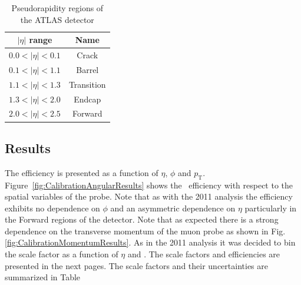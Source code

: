 \begin{table}[thbp]
  \centering
  \caption{Pseudorapidity regions of the ATLAS detector} \label{tab:CalibrationEtaRegions}
  \begin{tabular}{|c|c|}
    \hline 
    $|\eta|$ range & Name \\ \hline \hline
    $0.0<|\eta|<0.1$ & Crack \\
    $0.1<|\eta|<1.1$ & Barrel \\
    $1.1<|\eta|<1.3$ & Transition \\
    $1.3<|\eta|<2.0$ & Endcap \\
    $2.0<|\eta|<2.5$ & Forward \\
    \hline
  \end{tabular}
\end{table}

\subsection{Results}

The efficiency is presented as a function of $\eta$, $\phi$ and $p_{\textrm{T}}$. Figure~\ref{fig:CalibrationAngularResults} shows the \xsm\ efficiency with respect to the spatial variables of the probe. Note that as with the 2011 analysis the efficiency exhibits no dependence on $\phi$ and an asymmetric dependence on $\eta$ particularly in the Forward regions of the detector. Note that as expected there is a strong dependence on the transverse momentum of the muon probe as shown in Fig.\ref{fig:CalibrationMomentumResults}. As in the 2011 analysis it was decided to bin the scale factor as a function of $\eta$ and \pt. The scale factors and efficiencies are presented in the next pages. The scale factors and their uncertainties are summarized in Table~

